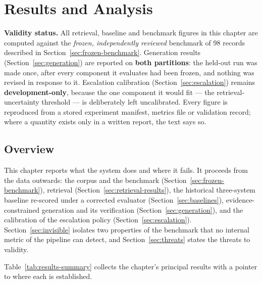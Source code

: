 \chapter{Results and Analysis}
\label{chap:results}

\begin{infobox}
\small\textbf{Validity status.}
All retrieval, baseline and benchmark figures in this chapter are computed against
the \emph{frozen, independently reviewed} benchmark of 98 records described in
Section~\ref{sec:frozen-benchmark}. Generation results (Section~\ref{sec:generation}) are reported on
\textbf{both partitions}: the held-out run was made once, after every component
it evaluates had been frozen, and nothing was revised in response to it.
Escalation calibration (Section~\ref{sec:escalation}) remains
\textbf{development-only}, because the one component it would fit --- the
retrieval-uncertainty threshold --- is deliberately left uncalibrated. Every
figure is reproduced from a stored experiment manifest, metrics file or validation
record; where a quantity exists only in a written report, the text says so.
\end{infobox}

\section{Overview}

This chapter reports what the system does and where it fails.
It proceeds from the data outwards: the corpus and the benchmark
(Section~\ref{sec:frozen-benchmark}), retrieval
(Section~\ref{sec:retrieval-results}), the historical three-system baseline
re-scored under a corrected evaluator (Section~\ref{sec:baselines}),
evidence-constrained generation and its verification
(Section~\ref{sec:generation}), and the calibration of the escalation policy
(Section~\ref{sec:escalation}). Section~\ref{sec:invisible} isolates two
properties of the benchmark that no internal metric of the pipeline can detect,
and Section~\ref{sec:threats} states the threats to validity.

Table~\ref{tab:results-summary} collects the chapter's principal results with a pointer to where each is established.

